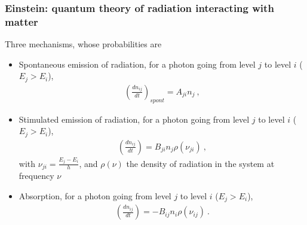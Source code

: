 \documentclass[letterpaper,10pt,english]{jupyterBook}
\begin{document}
\subsubsection{Einstein: quantum theory of radiation interacting with matter}
\label{\detokenize{ch/quantum-mechanics/history/einstein-planck:einstein-quantum-theory-of-radiation-interacting-with-matter}}\label{\detokenize{ch/quantum-mechanics/history/einstein-planck:quantum-mehcanics-history-light-matter-einstein}}
\sphinxAtStartPar
Three mechanisms, whose probabilities are
\begin{itemize}
\item {} 
\sphinxAtStartPar
Spontaneous emission of radiation, for a photon going from level \(j\) to level \(i\) (\(E_j > E_i\)),
\begin{equation*}
\begin{split}\left( \frac{d n_{ij}}{d t} \right)_{spont} = A_{ji} n_j \ ,\end{split}
\end{equation*}
\item {} 
\sphinxAtStartPar
Stimulated emission of radiation, for a photon going from level \(j\) to level \(i\) (\(E_j > E_i\)),
\begin{equation*}
\begin{split}\left( \frac{d n_{ij}}{d t} \right) = B_{ji} n_j \rho(\nu_{ji}) \ ,\end{split}
\end{equation*}
\sphinxAtStartPar
with \(\nu_{ji} = \frac{E_j - E_i}{h}\), and \(\rho(\nu)\) the density of radiation in the system at frequency \(\nu\)

\item {} 
\sphinxAtStartPar
Absorption, for a photon going from level \(j\) to level \(i\) (\(E_j > E_i\)),
\begin{equation*}
\begin{split}\left( \frac{d n_{ij}}{d t} \right) = - B_{ij} n_i \rho(\nu_{ij}) \ .\end{split}
\end{equation*}
\end{itemize}
\end{document}
